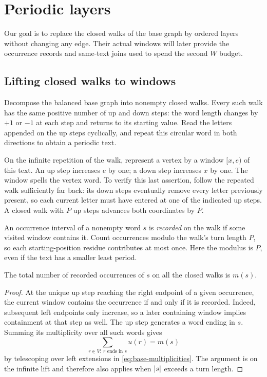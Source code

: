 \section{Periodic layers}\label{sec:layers}

Our goal is to replace the closed walks of the base graph by ordered layers without changing any edge. Their actual windows will later provide the occurrence records and same-text joins used to spend the second $W$ budget.

\subsection{Lifting closed walks to windows}

Decompose the balanced base graph into nonempty closed walks. Every such walk has the same positive number of up and down steps: the word length changes by $+1$ or $-1$ at each step and returns to its starting value. Read the letters appended on the up steps cyclically, and repeat this circular word in both directions to obtain a periodic text.

On the infinite repetition of the walk, represent a vertex by a window $[x,e)$ of this text. An up step increases $e$ by one; a down step increases $x$ by one. The window spells the vertex word. To verify this last assertion, follow the repeated walk sufficiently far back: its down steps eventually remove every letter previously present, so each current letter must have entered at one of the indicated up steps. A closed walk with $P$ up steps advances both coordinates by $P$.

An occurrence interval of a nonempty word $s$ is \emph{recorded} on the walk if some visited window contains it. Count occurrences modulo the walk's turn length $P$, so each starting-position residue contributes at most once. Here the modulus is $P$, even if the text has a smaller least period.

\begin{lemma}\label{lem:recorded}
The total number of recorded occurrences of $s$ on all the closed walks is $m(s)$.
\end{lemma}

\begin{proof}
At the unique up step reaching the right endpoint of a given occurrence, the current window contains the occurrence if and only if it is recorded. Indeed, subsequent left endpoints only increase, so a later containing window implies containment at that step as well. The up step generates a word ending in $s$. Summing its multiplicity over all such words gives
\[
\sum_{r\in V:\ r\text{ ends in }s}u(r)=m(s)
\]
by telescoping over left extensions in \eqref{eq:base-multiplicities}. The argument is on the infinite lift and therefore also applies when $\lvert s\rvert$ exceeds a turn length.
\end{proof}

